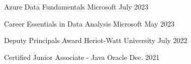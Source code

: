 

\begin{cvhonors}

  \cvhonor
    {Azure Data Fundamentals} %
    {Microsoft} %
    {} %
    {July 2023} %

  \cvhonor
    {Career Essentials in Data Analysis} %
    {Microsoft} %
    {} %
    {May 2023} %
    
\cvhonor
{Deputy Principals Award} %
{Heriot-Watt University} %
{} %
{July 2022} %


  \cvhonor
    {Certified Junior Associate - Java} %
    {Oracle} %
    {} %
    {Dec. 2021} %


\end{cvhonors}

